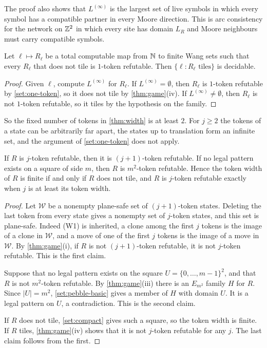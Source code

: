 The proof also shows that $L^{(\infty)}$ is the largest set of live symbols in which every symbol has a compatible partner in every Moore direction. This is arc consistency for the network on $\mathbb{Z}^2$ in which every site has domain $L_R$ and Moore neighbours must carry compatible symbols.

\begin{corollary}\label{set:one-token-family}
Let $\ell\mapsto R_\ell$ be a total computable map from $\mathbb{N}$ to finite Wang sets such that every $R_\ell$ that does not tile is $1$-token refutable. Then $\{\ell: R_\ell\text{ tiles}\}$ is decidable.
\end{corollary}

\begin{proof}
Given $\ell$, compute $L^{(\infty)}$ for $R_\ell$. If $L^{(\infty)}=\emptyset$, then $R_\ell$ is $1$-token refutable by \cref{set:one-token}, so it does not tile by \cref{thm:game}(iv). If $L^{(\infty)}\ne\emptyset$, then $R_\ell$ is not $1$-token refutable, so it tiles by the hypothesis on the family.
\end{proof}

So the fixed number of tokens in \cref{thm:width} is at least $2$. For $j\ge2$ the tokens of a state can be arbitrarily far apart, the states up to translation form an infinite set, and the argument of \cref{set:one-token} does not apply.

\begin{proposition}\label{set:finite-width}
If $R$ is $j$-token refutable, then it is $(j+1)$-token refutable. If no legal pattern exists on a square of side $m$, then $R$ is $m^2$-token refutable. Hence the token width of $R$ is finite if and only if $R$ does not tile, and $R$ is $j$-token refutable exactly when $j$ is at least its token width.
\end{proposition}

\begin{proof}
Let $\mathcal W$ be a nonempty plane-safe set of $(j+1)$-token states. Deleting the last token from every state gives a nonempty set of $j$-token states, and this set is plane-safe. Indeed (W1) is inherited, a clone among the first $j$ tokens is the image of a clone in $\mathcal W$, and a move of one of the first $j$ tokens is the image of a move in $\mathcal W$. By \cref{thm:game}(i), if $R$ is not $(j+1)$-token refutable, it is not $j$-token refutable. This is the first claim.

Suppose that no legal pattern exists on the square $U=\{0,\dots,m-1\}^2$, and that $R$ is not $m^2$-token refutable. By \cref{thm:game}(iii) there is an $E_{m^2}$ family $H$ for $R$. Since $|U|=m^2$, \cref{set:pebble-basic} gives a member of $H$ with domain $U$. It is a legal pattern on $U$, a contradiction. This is the second claim.

If $R$ does not tile, \cref{set:compact} gives such a square, so the token width is finite. If $R$ tiles, \cref{thm:game}(iv) shows that it is not $j$-token refutable for any $j$. The last claim follows from the first.
\end{proof}



